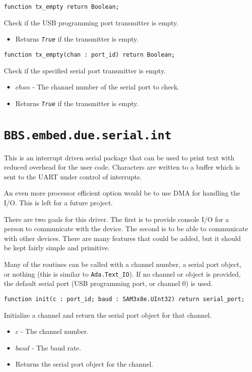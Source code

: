 \documentclass[10pt, openany]{book}
\newcommand{\indexfunc}[1]{\index[func]{#1}}
\newcommand{\package}[1]{\texttt{#1}}
\newcommand{\constant}[1]{\emph{\texttt{#1}}}
\begin{document}
\begin{lstlisting}
function tx_empty return Boolean;
\end{lstlisting}
\indexfunc{tx\_empty}
Check if the USB programming port transmitter is empty.
\begin{itemize}
  \item Returns \constant{True} if the transmitter is empty.
\end{itemize}

\begin{lstlisting}
function tx_empty(chan : port_id) return Boolean;
\end{lstlisting}
\indexfunc{tx\_empty}
Check if the specified serial port transmitter is empty.
\begin{itemize}
  \item $chan$ - The channel number of the serial port to check.
  \item Returns \constant{True} if the transmitter is empty.
\end{itemize}

\section{\package{BBS.embed.due.serial.int}}
This is an interrupt driven serial package that can be used to print text with reduced overhead for the user code.  Characters are written to a buffer which is sent to the UART under control of interrupts.

An even more processor efficient option would be to use DMA for handling the I/O.  This is left for a future project.

There are two goals for this driver.  The first is to provide console I/O for a person to communicate with the device.  The second is to be able to communicate with other devices.  There are many features that could be added, but it should be kept fairly simple and primitive.

Many of the routines can be called with a channel number, a serial port object, or nothing (this is similar to \package{Ada.Text\_IO}).  If no channel or object is provided, the default serial port (USB programming port, or channel 0) is used.

\begin{lstlisting}
function init(c : port_id; baud : SAM3x8e.UInt32) return serial_port;
\end{lstlisting}
\indexfunc{init}
Initialize a channel and return the serial port object for that channel.
\begin{itemize}
  \item $c$ - The channel number.
  \item $baud$ - The baud rate.
  \item Returns the serial port object for the channel.
\end{itemize}
\end{document}
